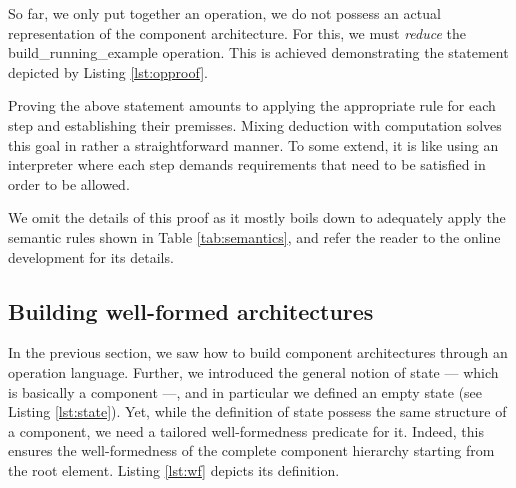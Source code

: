 	
			
	
	
	\noindent So far, we only put together an \textsf{operation}, we do not possess an actual representation of the
	\textsf{component} architecture. For this, we must \textit{reduce} the \textsf{build\_running\_example} \textsf{operation}. 
	This is achieved demonstrating the statement depicted by Listing 
	\ref{lst:opproof}. 
		
			
	
	
	Proving the above statement amounts to applying the appropriate
  rule for each step and establishing their premisses. Mixing
  deduction with computation solves this goal in
  rather a straightforward manner. To some extend, it is like
  using an interpreter where each step demands
  requirements that need to be satisfied in order to
  be allowed. 	
  
	We omit the details of this proof	 as it mostly boils down to adequately apply the semantic
   rules shown in Table \ref{tab:semantics}, and refer the reader to the online development for its details.
   	
 

\subsection{Building well-formed architectures} 
\label{sub:valid}


		In the previous section, we saw how to build \textsf{component} architectures through an \textsf{operation}
	language. Further, we introduced the general notion of \textsf{state} --- which is basically a \textsf{component} ---, 
	and in particular we defined an empty \textsf{state} (see Listing \ref{lst:state}). Yet, while the definition of \textsf{state}
	possess the same structure of a \textsf{component}, we need a tailored well-formedness predicate for it. Indeed,
	this ensures the well-formedness of the complete \textsf{component} hierarchy starting from the root element.
	Listing \ref{lst:wf} depicts its definition.	
		
  		
	
